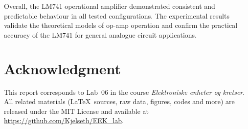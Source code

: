 \documentclass[conference]{IEEEtran}
\begin{document}
Overall, the LM741 operational amplifier demonstrated consistent and predictable behaviour in all tested configurations.  
The experimental results validate the theoretical models of op-amp operation and confirm the practical accuracy of the LM741 for general analogue circuit applications.  



\section*{Acknowledgment}
This report corresponds to Lab~06 in the course \emph{Elektroniske enheter og kretser}.
All related materials (\LaTeX~sources, raw data, figures, codes and more) are released under the MIT License and available at \url{https://github.com/Kjelseth/EEK_lab}.
\end{document}
